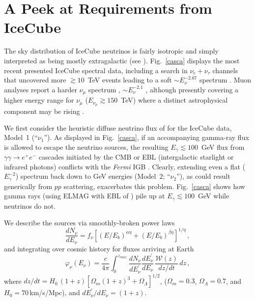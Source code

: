 \documentclass[aps,prd,nofootinbib,twocolumn,floatfix,letterpaper,superscriptaddress,showpacs]{revtex4}
\begin{document}
\section{A Peek at Requirements from IceCube}
%
The sky distribution of IceCube neutrinos is fairly isotropic \cite{Aartsen2013,Aartsen2013b,Aartsen2014} and simply interpreted as being mostly extragalactic (see \cite{Kistler2015d}).  Fig.~\ref{casca} displays the most recent presented IceCube spectral data, including a search in $\nu_e + \nu_\tau$ channels that uncovered more $\gtrsim\! 10$~TeV events leading to a soft $\sim\! E_\nu^{-2.67}$ spectrum \cite{Niederhausen2015}.  Muon analyses report a harder $\nu_\mu$ spectrum \cite{Aartsen2015b}, $\sim\! E_\nu^{-2.1}$ \cite{Aartsen:2016xlq}, although presently covering a higher energy range for $\nu_\mu$ ($E_{\nu_\mu} \!\gtrsim\! 150$~TeV) where a distinct astrophysical component may be rising \cite{Kistler2016}.

We first consider the heuristic diffuse neutrino flux of \cite{Kistler2015c} for the IceCube data, Model~1 (``$\nu_1$'').  As displayed in Fig.~\ref{casca}, if an accompanying gamma-ray flux is allowed to escape the neutrino sources, the resulting $E_\gamma \!\lesssim\! 100$~GeV flux from $\gamma \gamma \!\rightarrow\! e^+ e^-$ cascades initiated by the CMB or EBL (intergalactic starlight or infrared photons) conflicts \cite{Murase2013,Kistler2015c} with the {\it Fermi} IGB \cite{Ackermann2015}.  Clearly, extending even a flat ($E_\gamma^{-2}$) spectrum back down to GeV energies (Model~2; ``$\nu_2$''), as could result generically from $pp$ scattering, exacerbates this problem.  Fig.~\ref{casca} shows how gamma rays (using ELMAG \cite{Kachelriess2012} with EBL of \cite{Kneiske:2003tx}) pile up at $E_\gamma \!\lesssim\! 100$~GeV while neutrinos do not.

We describe the sources via smoothly-broken power laws
%
\begin{equation}
      \frac{dN_\nu}{dE_\nu}  =   f_\nu
       \left[\left(E/E_b\right)^{\alpha \eta} + \left(E/E_b\right)^{\beta \eta} \right]^{1/\eta} \,,
\label{specfit}
\end{equation}
%
and integrating over cosmic history for fluxes arriving at Earth
%
\begin{equation}
  \varphi_\nu(E_\nu) = \frac{c}{4 \pi } \int_0^{z_{max}} \frac{dN_{\nu}}{dE_{\nu}^\prime}  \frac{dE_{\nu}^\prime}{dE_{\nu}}\, \frac{\mathcal{W}(z)}{dz/dt} \,dz \,,
\label{f2}
\end{equation}
%
where ${dz}/{dt} \!=\! H_0\, (1 \!+\! z) [\Omega_m (1 \!+\! z)^3 \!+\! \Omega_\Lambda ]^{1/2}$, ($\Omega_m \!=\! 0.3$, $\Omega_{\Lambda} \!=\!0.7$, and ${H}_{0} \!=\! 70\,$km/s/Mpc), and $dE_\nu^\prime/dE_\nu \!=\! (1+z)$.
\end{document}
